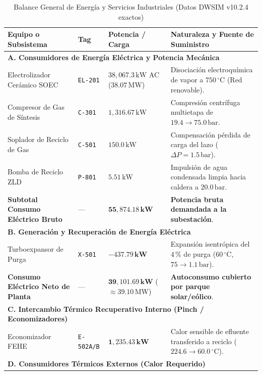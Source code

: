 \documentclass[11pt,a4paper]{article}
\begin{document}
\begin{table}[H]
\centering
\small
\caption{Balance General de Energía y Servicios Industriales (Datos DWSIM v10.2.4 exactos)}
\label{tab:balance_energia}
\begin{tabular}{p{5.5cm} p{1.8cm} p{3.2cm} p{4.2cm}}
\toprule
\textbf{Equipo o Subsistema} & \textbf{Tag} & \textbf{Potencia / Carga} & \textbf{Naturaleza y Fuente de Suministro} \\
\midrule
\multicolumn{4}{l}{\textbf{A. Consumidores de Energía Eléctrica y Potencia Mecánica}} \\
\midrule
Electrolizador Cerámico SOEC & \texttt{EL-201} & $38{,}067.3\,\text{kW}$ AC ($38.07\,\text{MW}$) & Disociación electroquímica de vapor a $750\,^\circ\text{C}$ (Red renovable). \\
Compresor de Gas de Síntesis & \texttt{C-301} & $1{,}316.67\,\text{kW}$ & Compresión centrífuga multietapa de $19.4 \to 75.0\,\text{bar}$. \\
Soplador de Reciclo de Gas & \texttt{C-501} & $150.0\,\text{kW}$ & Compensación pérdida de carga del lazo ($\Delta P = 1.5\,\text{bar}$). \\
Bomba de Reciclo ZLD & \texttt{P-801} & $5.51\,\text{kW}$ & Impulsión de agua condensada limpia hacia caldera a $20.0\,\text{bar}$. \\
\midrule
\textbf{Subtotal Consumo Eléctrico Bruto} & --- & $\mathbf{55{,}874.18\,\text{kW}}$ & \textbf{Potencia bruta demandada a la subestación}. \\
\midrule
\multicolumn{4}{l}{\textbf{B. Generación y Recuperación de Energía Eléctrica}} \\
\midrule
Turboexpansor de Purga & \texttt{X-501} & $\mathbf{-437.79\,\text{kW}}$ & Expansión isentrópica del $4\,\%$ de purga ($60\,^\circ\text{C}$, $75 \to 1.1\,\text{bar}$). \\
\midrule
\textbf{Consumo Eléctrico Neto de Planta} & --- & $\mathbf{39{,}101.69\,\text{kW}}$ ($\approx 39.10\,\text{MW}$) & \textbf{Autoconsumo cubierto por parque solar/eólico}. \\
\midrule
\multicolumn{4}{l}{\textbf{C. Intercambio Térmico Recuperativo Interno (Pinch / Economizadores)}} \\
\midrule
Economizador FEHE & \texttt{E-502A/B} & $\mathbf{1{,}235.43\,\text{kW}}$ & Calor sensible de efluente transferido a reciclo ($224.6 \to 60.0\,^\circ\text{C}$). \\
\midrule
\multicolumn{4}{l}{\textbf{D. Consumidores Térmicos Externos (Calor Requerido)}} \\

\end{tabular}
\end{table}
\end{document}
